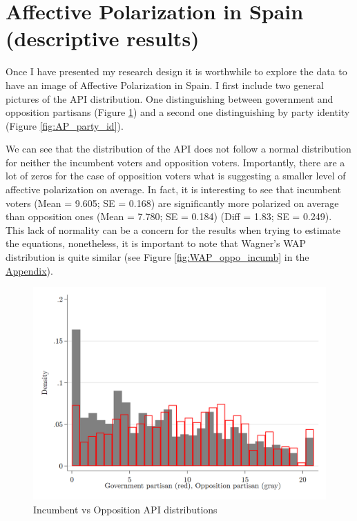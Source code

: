 \documentclass[a4paper, svgnames]{article}
\begin{document}
\section{Affective Polarization in Spain (descriptive results)}

Once I have presented my research design it is worthwhile to explore the data to have an image of Affective Polarization in Spain. I first include two general pictures of the API distribution. One distinguishing between government and opposition partisans (Figure \ref{fig:AP_partisan}) and a second one distinguishing by party identity (Figure \ref{fig:AP_party_id}).

We can see that the distribution of the API does not follow a normal distribution for neither the incumbent voters and opposition voters. Importantly, there are a lot of zeros for the case of opposition voters what is suggesting a smaller level of affective polarization on average. In fact, it is interesting to see that incumbent voters (Mean = 9.605; SE = 0.168) are significantly more polarized on average than opposition ones (Mean = 7.780; SE = 0.184) (Diff = 1.83; SE = 0.249). This lack of normality can be a concern for the results when trying to estimate the equations, nonetheless, it is important to note that Wagner's WAP distribution is quite similar (see Figure \ref{fig:WAP_oppo_incumb} in the \hyperref[appendix]{Appendix}).

\begin{figure}[H]
	\centering
	\caption{\label{fig:AP_partisan} Incumbent vs Opposition API distributions}
	\includegraphics[scale=0.25]{Figures/AP_index_by_partisanship.png}
\end{figure}
\end{document}
